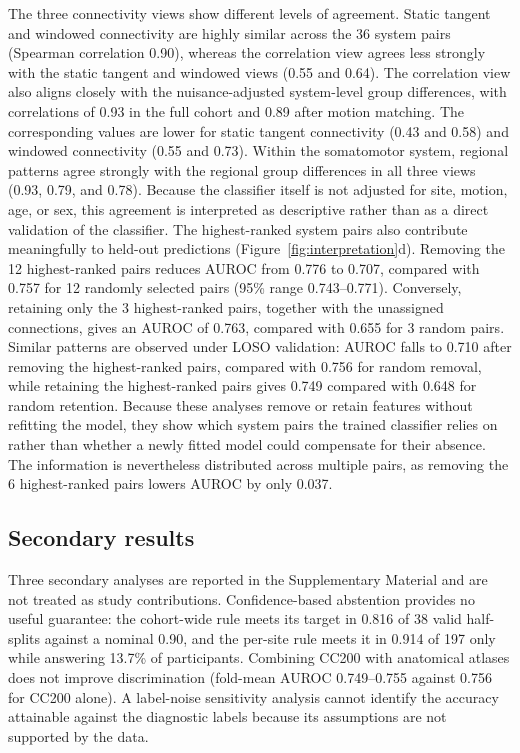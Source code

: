 The three connectivity views show different levels of agreement. Static tangent and windowed connectivity are highly similar across the 36 system pairs (Spearman correlation 0.90), whereas the correlation view agrees less strongly with the static tangent and windowed views (0.55 and 0.64). The correlation view also aligns closely with the nuisance-adjusted system-level group differences, with correlations of 0.93 in the full cohort and 0.89 after motion matching. The corresponding values are lower for static tangent connectivity (0.43 and 0.58) and windowed connectivity (0.55 and 0.73). Within the somatomotor system, regional patterns agree strongly with the regional group differences in all three views (0.93, 0.79, and 0.78). Because the classifier itself is not adjusted for site, motion, age, or sex, this agreement is interpreted as descriptive rather than as a direct validation of the classifier. The highest-ranked system pairs also contribute meaningfully to held-out predictions (Figure~\ref{fig:interpretation}d). Removing the 12 highest-ranked pairs reduces AUROC from 0.776 to 0.707, compared with 0.757 for 12 randomly selected pairs (95\% range 0.743--0.771). Conversely, retaining only the 3 highest-ranked pairs, together with the unassigned connections, gives an AUROC of 0.763, compared with 0.655 for 3 random pairs. Similar patterns are observed under LOSO validation: AUROC falls to 0.710 after removing the highest-ranked pairs, compared with 0.756 for random removal, while retaining the highest-ranked pairs gives 0.749 compared with 0.648 for random retention. Because these analyses remove or retain features without refitting the model, they show which system pairs the trained classifier relies on rather than whether a newly fitted model could compensate for their absence. The information is nevertheless distributed across multiple pairs, as removing the 6 highest-ranked pairs lowers AUROC by only 0.037.

\subsection{Secondary results}
\label{subsec:results-secondary}

Three secondary analyses are reported in the Supplementary Material and are not treated as study contributions. Confidence-based abstention provides no useful guarantee: the cohort-wide rule meets its target in 0.816 of 38 valid half-splits against a nominal 0.90, and the per-site rule meets it in 0.914 of 197 only while answering 13.7\% of participants. Combining CC200 with anatomical atlases does not improve discrimination (fold-mean AUROC 0.749--0.755 against 0.756 for CC200 alone). A label-noise sensitivity analysis cannot identify the accuracy attainable against the diagnostic labels because its assumptions are not supported by the data.
